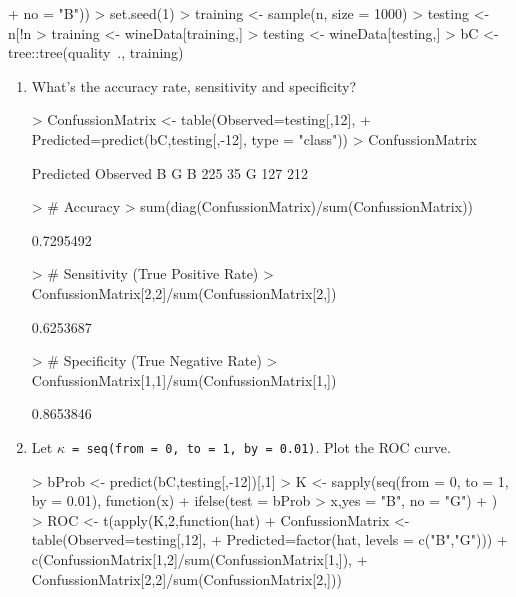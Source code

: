 \documentclass[12pt,a4paper]{paper}
\begin{document}
\begin{enumerate}
\begin{enumerate}
\begin{Schunk}
\begin{Sinput}
+                                no = "B"))
> set.seed(1)
> training <- sample(n, size = 1000)
> testing <- n[!n %
> training <- wineData[training,]
> testing <- wineData[testing,]
> bC <- tree::tree(quality~., training)
\end{Sinput}
\end{Schunk}
\begin{enumerate}
\item What’s the accuracy rate, sensitivity and specificity?
\begin{Schunk}
\begin{Sinput}
> ConfussionMatrix <- table(Observed=testing[,12],
+   Predicted=predict(bC,testing[,-12], type = "class"))
> ConfussionMatrix
\end{Sinput}
\begin{Soutput}
        Predicted
Observed   B   G
       B 225  35
       G 127 212
\end{Soutput}
\begin{Sinput}
> # Accuracy
> sum(diag(ConfussionMatrix)/sum(ConfussionMatrix))
\end{Sinput}
\begin{Soutput}
[1] 0.7295492
\end{Soutput}
\begin{Sinput}
> # Sensitivity (True Positive Rate)
> ConfussionMatrix[2,2]/sum(ConfussionMatrix[2,])
\end{Sinput}
\begin{Soutput}
[1] 0.6253687
\end{Soutput}
\begin{Sinput}
> # Specificity (True Negative Rate)
> ConfussionMatrix[1,1]/sum(ConfussionMatrix[1,])
\end{Sinput}
\begin{Soutput}
[1] 0.8653846
\end{Soutput}
\end{Schunk}
\item Let $\kappa$\texttt{ = seq(from = 0, to = 1, by = 0.01)}. Plot the ROC curve.
\begin{Schunk}
\begin{Sinput}
> bProb <- predict(bC,testing[,-12])[,1]
> K <- sapply(seq(from = 0, to = 1, by = 0.01), function(x){
+   ifelse(test = bProb > x,yes = "B", no = "G")
+ })
> ROC <- t(apply(K,2,function(hat){
+   ConfussionMatrix <- table(Observed=testing[,12],
+                             Predicted=factor(hat, levels = c("B","G")))
+   c(ConfussionMatrix[1,2]/sum(ConfussionMatrix[1,]),
+     ConfussionMatrix[2,2]/sum(ConfussionMatrix[2,]))
}
\end{Sinput}
\end{Schunk}
\end{enumerate}
\end{enumerate}
\end{enumerate}
\end{document}

